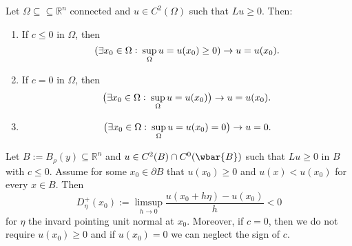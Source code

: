 \begin{theorem}
	\label{thm:SMP}
	Let $\Omega \subseteq \subseteq \mathbb{R}^n$ connected and $u \in C^2(\Omega)$ such that $Lu \geq 0$. Then:
	\begin{enumerate}[label = \textup{(}\alph*\textup{)},wide=0pt]
		\item If $c \leq 0$ in $\Omega$, then 
			\begin{equation*}
				\del[0]{\exists x_0 \in \Omega:\> \sup_\Omega u = u(x_0) \geq 0} \rightarrow u = u(x_0).
			\end{equation*}
		\item If $c = 0$ in $\Omega$, then
			\begin{equation*}
				\del[1]{\exists x_0 \in \Omega:\> \sup_\Omega u = u(x_0)} \rightarrow u = u(x_0).
			\end{equation*}
		\item 
			\begin{equation*}
				\del[1]{\exists x_0 \in \Omega:\> \sup_\Omega u = u(x_0) = 0} \rightarrow u = 0.
			\end{equation*}
	\end{enumerate}
\end{theorem}

\begin{lemma}
	Let $B := B_\rho(y) \subseteq \mathbb{R}^n$ and $u \in C^2(B) \cap C^0(\wbar{B})$ such that $Lu \geq 0$ in $B$ with $c \leq 0$. Assume for some $x_0 \in \partial B$ that $u(x_0) \geq 0$ and $u(x) < u(x_0)$ for every $x \in B$. Then
	\begin{equation*}
		D_\eta^+(x_0) := \limsup_{h \to 0} \frac{u(x_0 + h\eta) - u(x_0)}{h} < 0
	\end{equation*}
	\noindent for $\eta$ the invard pointing unit normal at $x_0$. Moreover, if $c = 0$, then we do not require $u(x_0) \geq 0$ and if $u(x_0) = 0$ we can neglect the sign of $c$.
\end{lemma}

